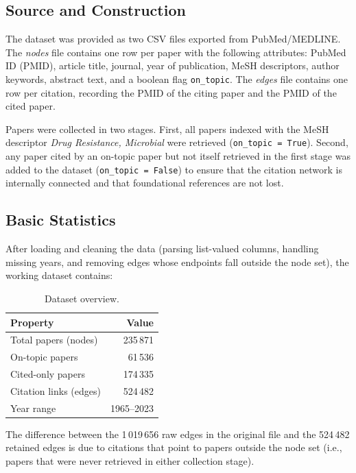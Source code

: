 \documentclass[12pt,a4paper]{article}
\begin{document}
\subsection{Source and Construction}

The dataset was provided as two CSV files exported from PubMed/MEDLINE.
The \textit{nodes} file contains one row per paper with the following attributes:
PubMed ID (PMID), article title, journal, year of publication, MeSH descriptors,
author keywords, abstract text, and a boolean flag \texttt{on\_topic}.
The \textit{edges} file contains one row per citation, recording the PMID of the citing
paper and the PMID of the cited paper.

Papers were collected in two stages.
First, all papers indexed with the MeSH descriptor \emph{Drug Resistance, Microbial}
were retrieved (\texttt{on\_topic = True}).
Second, any paper cited by an on-topic paper but not itself retrieved in the first stage
was added to the dataset (\texttt{on\_topic = False}) to ensure that the citation
network is internally connected and that foundational references are not lost.

\subsection{Basic Statistics}

After loading and cleaning the data (parsing list-valued columns, handling missing years,
and removing edges whose endpoints fall outside the node set), the working dataset
contains:

\begin{table}[H]
\centering
\caption{Dataset overview.}
\begin{tabular}{lr}
\toprule
\textbf{Property} & \textbf{Value} \\
\midrule
Total papers (nodes)       & 235\,871 \\
On-topic papers            & 61\,536  \\
Cited-only papers          & 174\,335 \\
Citation links (edges)     & 524\,482 \\
Year range                 & 1965--2023 \\
\bottomrule
\end{tabular}
\label{tab:dataset}
\end{table}

The difference between the 1\,019\,656 raw edges in the original file and the 524\,482
retained edges is due to citations that point to papers outside the node set (i.e.,
papers that were never retrieved in either collection stage).
\end{document}
